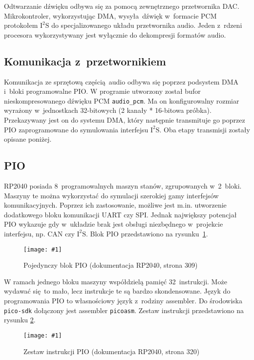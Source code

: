 \documentclass[polish]{aghengthesis}
\newcommand{\imgint}[4]{
	\begin{figure}[{#4}]
		\centering
		\texttt{[image: \#1]}
		\caption{#2}
		\label{#1}
	\end{figure}
}
\newcommand{\imgh}[3]{\imgint{#1}{#2}{#3}{H}}
\newcommand{\isqs}{$\text{I}^{2}\text{S}$}
\begin{document}
		
			
		Odtwarzanie dźwięku odbywa się za pomocą zewnętrznego przetwornika DAC. Mikrokontroler, wykorzystując DMA, wysyła dźwięk w~formacie PCM protokołem \isqs{} do specjalizowanego układu przetwornika audio. Jeden z~rdzeni procesora wykorzystywany jest wyłącznie do dekompresji formatów audio.
		
		
		\subsection{Komunikacja z~przetwornikiem}
			Komunikacja ze sprzętową częścią audio odbywa się poprzez podsystem DMA i~bloki programowalne PIO.
			W programie utworzony został bufor nieskompresowanego dźwięku PCM \lstinline|audio_pcm|. Ma on konfigurowalny rozmiar wyrażony w~jednostkach 32-bitowych (2 kanały * 16-bitowa próbka). Przekazywany jest on do systemu DMA, który następnie transmituje go poprzez PIO zaprogramowane do symulowania interfejsu \isqs{}. Oba etapy transmisji zostały opisane poniżej.
		
		\subsection{PIO}
			RP2040 posiada 8~programowalnych maszyn stanów, zgrupowanych w~2~bloki.
			Maszyny te można wykorzystać do symulacji szerokiej gamy interfejsów komunikacyjnych.
			Poprzez ich zastosowanie, możliwe jest m.in. utworzenie dodatkowego bloku komunikacji UART czy SPI.
			Jednak największy potencjał PIO wykazuje gdy w~układzie brak jest obsługi niezbędnego w~projekcie interfejsu, np. CAN czy \isqs{}.
			Blok PIO przedstawiono na rysunku~\ref{3/pio_block}.
			\imgh{3/pio_block}{Pojedynczy blok PIO (dokumentacja RP2040\textsuperscript{\cite{pico_pdf}}, strona 309)}{0.75}
			
			W ramach jednego bloku maszyny współdzielą pamięć 32 instrukcji. Może wydawać się to mało, lecz instrukcje te są bardzo skondensowane. Język do programowania PIO to własnościowy język z~rodziny assembler. Do środowiska \lstinline|pico-sdk| dołączony jest assembler \lstinline|picoasm|. Zestaw instrukcji przedstawiono na rysunku \ref{3/pio_instr}.
			\imgh{3/pio_instr}{Zestaw instrukcji PIO (dokumentacja RP2040, strona 320)}{0.7}
			
\end{document}
